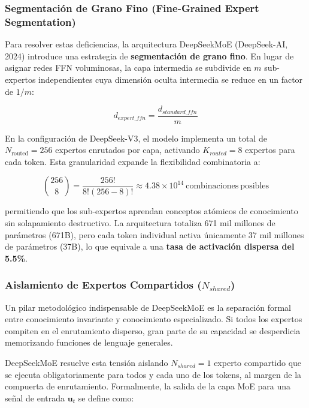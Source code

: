 \subsubsection{Segmentación de Grano Fino (Fine-Grained Expert Segmentation)}

Para resolver estas deficiencias, la arquitectura DeepSeekMoE (DeepSeek-AI, 2024) introduce una estrategia de \textbf{segmentación de grano fino}. En lugar de asignar redes FFN voluminosas, la capa intermedia se subdivide en $m$ sub-expertos independientes cuya dimensión oculta intermedia se reduce en un factor de $1/m$:

\begin{equation}
d_{expert\_ffn} = \frac{d_{standard\_ffn}}{m}
\end{equation}

En la configuración de DeepSeek-V3, el modelo implementa un total de $N_{\mathrm{routed}} = 256$ expertos enrutados por capa, activando $K_{routed} = 8$ expertos para cada token. Esta granularidad expande la flexibilidad combinatoria a:

\begin{equation}
\binom{256}{8} = \frac{256!}{8!(256-8)!} \approx 4.38 \times 10^{14}\ \mathrm{combinaciones\ posibles}
\end{equation}

permitiendo que los sub-expertos aprendan conceptos atómicos de conocimiento sin solapamiento destructivo. La arquitectura totaliza 671 mil millones de parámetros (671B), pero cada token individual activa únicamente 37 mil millones de parámetros (37B), lo que equivale a una \textbf{tasa de activación dispersa del 5.5\%}.

\subsubsection{Aislamiento de Expertos Compartidos ($N_{shared}$)}

Un pilar metodológico indispensable de DeepSeekMoE es la separación formal entre conocimiento invariante y conocimiento especializado. Si todos los expertos compiten en el enrutamiento disperso, gran parte de su capacidad se desperdicia memorizando funciones de lenguaje generales. 

DeepSeekMoE resuelve esta tensión aislando $N_{shared} = 1$ experto compartido que se ejecuta obligatoriamente para todos y cada uno de los tokens, al margen de la compuerta de enrutamiento. Formalmente, la salida de la capa MoE para una señal de entrada $\mathbf{u}_t$ se define como:

